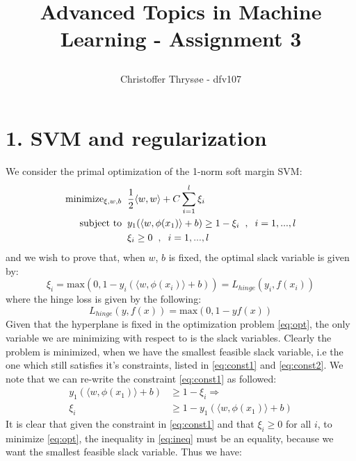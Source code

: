 \documentclass{article}
\title{
\vspace{1in}
\textmd{\textbf{Advanced Topics in Machine Learning - Assignment 3}} \\
\author{Christoffer Thrysøe - dfv107}
}
\begin{document}
\maketitle
{}
\section{1. SVM and regularization}
We consider the primal optimization of the 1-norm soft margin SVM:
\begin{align}
\label{eq:opt}
\text{minimize}_{\xi,w,b} \hspace{0.2cm} &\dfrac{1}{2} \langle w,w \rangle + C \sum\limits_{i=1}^l \xi_i \\
\label{eq:const1}
\text{subject to} \hspace{0.2cm} &y_1(\langle w,\phi(x_1) \rangle +b) \geq 1-\xi_i \hspace{0.2cm} , \hspace{0.2cm} i = 1,...,l \\
\label{eq:const2}
&\xi_i \geq 0 \hspace{0.2cm} , \hspace{0.2cm} i=1,...,l
\end{align}
and we wish to prove that, when $w$, $b$ is fixed, the optimal slack variable is given by:
\begin{equation}
\xi_i = \text{max}(0,1-y_i(\langle w, \phi(x_i)\rangle +b )) = L_{hinge}(y_i,f(x_i))
\end{equation}
where the hinge loss is given by the following:
\begin{equation}
\label{eq:hinge}
L_{hinge}(y,f(x)) = \text{max}(0,1-yf(x))
\end{equation}
Given that the hyperplane is fixed in the optimization problem \eqref{eq:opt}, the only variable we are minimizing with respect to is the slack variables. Clearly the problem is minimized, when we have the smallest feasible slack variable, i.e the one which still satisfies it's constraints, listed in \eqref{eq:const1} and \eqref{eq:const2}. We note that we can re-write the constraint \eqref{eq:const1} as followed:
\begin{align}
y_1(\langle w,\phi(x_1) \rangle +b) &\geq 1-\xi_i \Rightarrow \\
\label{eq:ineq}
\xi_i &\geq 1-y_1(\langle w,\phi(x_1) \rangle +b)
\end{align}
It is clear that given the constraint in \eqref{eq:const1} and that $\xi_i \geq 0$ for all $i$, to minimize \eqref{eq:opt}, the inequality in \eqref{eq:ineq} must be an equality, because we want the smallest feasible slack variable. Thus we have:
\end{document}

